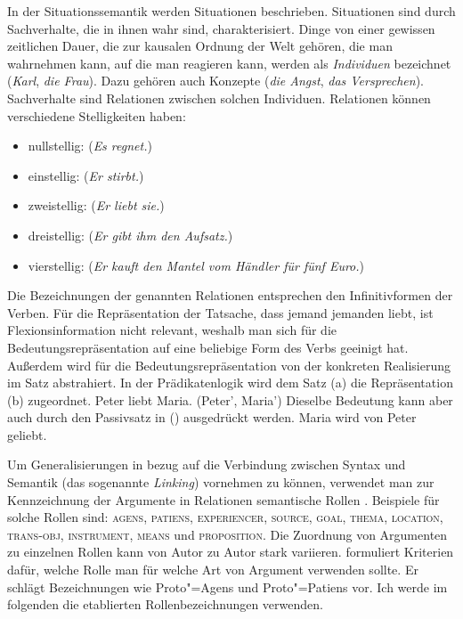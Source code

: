 In der Situationssemantik werden Situationen beschrieben.
Situationen sind durch Sachverhalte, die in ihnen wahr sind, charakterisiert.
Dinge von einer gewissen zeitlichen Dauer, die zur kausalen Ordnung der
Welt gehören, die man wahrnehmen kann, auf die man reagieren kann,
werden als \emph{Individuen} bezeichnet (\emph{Karl}, \emph{die Frau}).
Dazu gehören auch Konzepte (\emph{die Angst}, \emph{das Versprechen}).
Sachverhalte sind Relationen zwischen solchen Individuen.
Relationen können verschiedene Stelligkeiten haben:
\begin{itemize}
\item nullstellig:  (\emph{Es regnet.}) 
\item einstellig:  (\emph{Er stirbt.})
\item zweistellig:   (\emph{Er liebt sie.})
\item dreistellig:    (\emph{Er gibt ihm den Aufsatz.})
\item vierstellig:   (\emph{Er kauft den Mantel vom Händler für fünf Euro.})
\end{itemize}
Die Bezeichnungen der genannten Relationen entsprechen den Infinitivformen
der Verben. Für die Repräsentation der Tatsache, dass jemand jemanden liebt,
ist Flexionsinformation nicht relevant, weshalb man sich für die Bedeutungsrepräsentation
auf eine beliebige Form des Verbs geeinigt hat. Außerdem wird für die Bedeutungsrepräsentation
von der konkreten Realisierung im Satz abstrahiert. In der Prädikatenlogik wird
\zb dem Satz (a) die Repräsentation (b) zugeordnet.
\eal
\ex Peter liebt Maria.
\ex {}(Peter', Maria')
\zl
Dieselbe Bedeutung kann aber auch durch den Passivsatz in () ausgedrückt werden.
\ea
Maria wird von Peter geliebt.
\z

\noindent
Um Generalisierungen in bezug auf die Verbindung zwischen Syntax und Semantik (das sogenannte
\emph{Linking}) vornehmen zu können, verwendet man zur Kennzeichnung der Argumente
in Relationen semantische Rollen \citep{Fillmore68,Fillmore77,Kunze91}. Beispiele für
solche Rollen sind: 
\textsc{agens}, 
\textsc{patiens}, 
\textsc{experiencer}, 
\textsc{source}, 
\textsc{goal}, 
\textsc{thema}, 
\textsc{location}, 
\textsc{trans-obj}, 
\textsc{instrument}, 
\textsc{means} und 
\textsc{proposition}.
Die Zuordnung von Argumenten zu einzelnen Rollen kann von Autor zu Autor stark variieren.
\citet{Dowty91a} formuliert Kriterien dafür, welche Rolle man für welche Art von Argument
verwenden sollte. Er schlägt Bezeichnungen wie Proto"=Agens und Proto"=Patiens vor.
Ich werde im folgenden die etablierten Rollenbezeichnungen verwenden.

